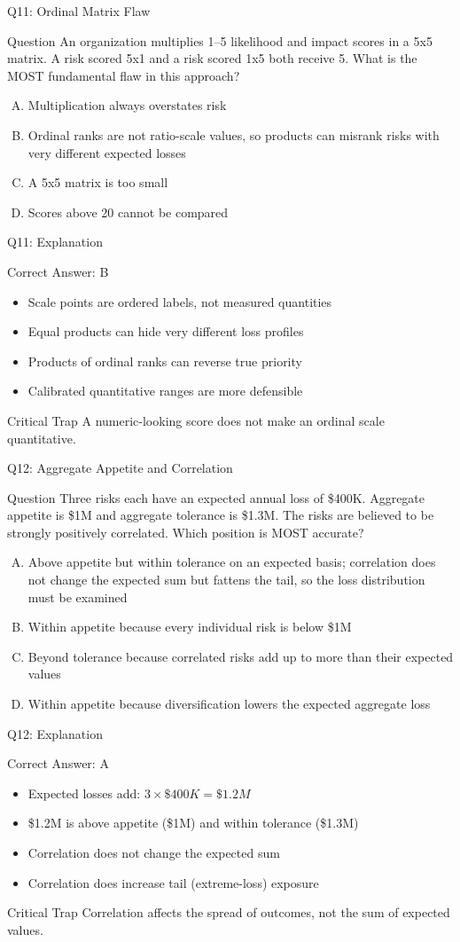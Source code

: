 \documentclass[aspectratio=169]{beamer}
\newcommand{\hq}[7]{%
  \begin{frame}{Q#1: #2}
    \begin{block}{Question}
      #3
    \end{block}
    \begin{enumerate}[(A)]
      #4
    \end{enumerate}
  \end{frame}
  \begin{frame}{Q#1: Explanation}
    \begin{block}{Correct Answer: #5}
      \begin{itemize}
        #6
      \end{itemize}
    \end{block}
    \begin{alertblock}{Critical Trap}
      #7
    \end{alertblock}
  \end{frame}
}
\begin{document}
\hq{11}{Ordinal Matrix Flaw}
{An organization multiplies 1--5 likelihood and impact scores in a 5x5 matrix. A risk scored 5x1 and a risk scored 1x5 both receive 5. What is the MOST fundamental flaw in this approach?}
{\item Multiplication always overstates risk
 \item Ordinal ranks are not ratio-scale values, so products can misrank risks with very different expected losses
 \item A 5x5 matrix is too small
 \item Scores above 20 cannot be compared}
{B}
{\item Scale points are ordered labels, not measured quantities
 \item Equal products can hide very different loss profiles
 \item Products of ordinal ranks can reverse true priority
 \item Calibrated quantitative ranges are more defensible}
{A numeric-looking score does not make an ordinal scale quantitative.}

\hq{12}{Aggregate Appetite and Correlation}
{Three risks each have an expected annual loss of \$400K. Aggregate appetite is \$1M and aggregate tolerance is \$1.3M. The risks are believed to be strongly positively correlated. Which position is MOST accurate?}
{\item Above appetite but within tolerance on an expected basis; correlation does not change the expected sum but fattens the tail, so the loss distribution must be examined
 \item Within appetite because every individual risk is below \$1M
 \item Beyond tolerance because correlated risks add up to more than their expected values
 \item Within appetite because diversification lowers the expected aggregate loss}
{A}
{\item Expected losses add: $3 \times \$400K = \$1.2M$
 \item \$1.2M is above appetite (\$1M) and within tolerance (\$1.3M)
 \item Correlation does not change the expected sum
 \item Correlation does increase tail (extreme-loss) exposure}
{Correlation affects the spread of outcomes, not the sum of expected values.}
\end{document}
